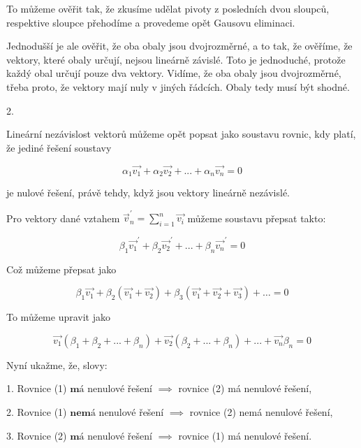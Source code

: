 \documentclass[10pt,a4paper]{article}
\begin{document}
To můžeme ověřit tak, že zkusíme udělat pivoty z posledních dvou sloupců, respektive sloupce přehodíme a provedeme opět Gausovu eliminaci. 

Jednodušší je ale ověřit, že oba obaly jsou dvojrozměrné, a to tak, že ověříme, že vektory, které obaly určují, nejsou lineárně závislé. Toto je jednoduché, protože každý obal určují pouze dva vektory. Vidíme, že oba obaly jsou dvojrozměrné, třeba proto, že vektory mají nuly v jiných řádcích. Obaly tedy musí být shodné.

\hfill

2.

Lineární nezávislost vektorů můžeme opět popsat jako soustavu rovnic, kdy platí, že jediné řešení soustavy

\begin{equation}
\alpha_1 \vec{v_1} + \alpha_2 \vec{v_2} + ... + \alpha_n \vec{v_n} = 0
\end{equation}

je nulové řešení, právě tehdy, když jsou vektory lineárně nezávislé.

Pro vektory dané vztahem $\vec{v}_n^\prime = \sum_{i=1}^n \vec{v_i}$ můžeme soustavu přepsat takto:

\begin{equation*}
\beta_1 \vec{v_1}^\prime + \beta_2 \vec{v_2}^\prime + ... + \beta_n \vec{v_n}^\prime = 0
\end{equation*}

Což můžeme přepsat jako

\begin{equation*}
\beta_1 \vec{v_1} + \beta_2  (\vec{v_1} + \vec{v_2}) + \beta_3  (\vec{v_1}+ \vec{v_2} + \vec{v_3}) + \hdots = 0
\end{equation*}

To můžeme upravit jako

\begin{equation}
\vec{v_1} (\beta_1 + \beta_2 + ... + \beta_n) + \vec{v_2} (\beta_2 + ... + \beta_n) + ... + \vec{v_n} \beta_n   = 0
\end{equation}

\hfill

Nyní ukažme, že, slovy:

1. Rovnice (1) $\textbf{má}$ nenulové řešení $\implies$ rovnice (2) má nenulové řešení,

2. Rovnice (1) $\textbf{nemá}$ nenulové řešení $\implies$ rovnice (2) nemá nenulové řešení,

3. Rovnice (2) $\textbf{má}$ nenulové řešení $\implies$ rovnice (1) má nenulové řešení.
\end{document}
